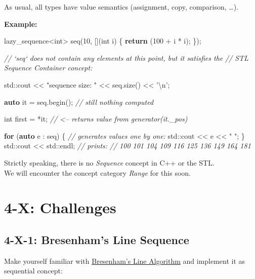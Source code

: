 \documentclass[]{article}
\newenvironment{Shaded}{}{}
\newcommand{\KeywordTok}[1]{\textcolor[rgb]{0.00,0.44,0.13}{\textbf{{#1}}}}
\newcommand{\DataTypeTok}[1]{\textcolor[rgb]{0.56,0.13,0.00}{{#1}}}
\newcommand{\DecValTok}[1]{\textcolor[rgb]{0.25,0.63,0.44}{{#1}}}
\newcommand{\CharTok}[1]{\textcolor[rgb]{0.25,0.44,0.63}{{#1}}}
\newcommand{\StringTok}[1]{\textcolor[rgb]{0.25,0.44,0.63}{{#1}}}
\newcommand{\CommentTok}[1]{\textcolor[rgb]{0.38,0.63,0.69}{\textit{{#1}}}}
\newcommand{\NormalTok}[1]{{#1}}
\begin{document}
As usual, all types have value semantics (assignment, copy, comparison,
\ldots{}).

\textbf{Example:}

\begin{Shaded}
\begin{Highlighting}[]
  \NormalTok{lazy_sequence<}\DataTypeTok{int}\NormalTok{> seq(}\DecValTok{10}\NormalTok{,}
                        \NormalTok{[](}\DataTypeTok{int} \NormalTok{i) \{}
                          \KeywordTok{return} \NormalTok{(}\DecValTok{100} \NormalTok{+ i * i);}
                        \NormalTok{\});}

  \CommentTok{// `seq` does not contain any elements at this point, but it satisfies the}
  \CommentTok{// STL Sequence Container concept:}

  \NormalTok{std::cout << }\StringTok{"sequence size: "} \NormalTok{<< seq.size() << }\StringTok{'}\CharTok{\textbackslash{}n}\StringTok{'}\NormalTok{;}

  \KeywordTok{auto} \NormalTok{it = seq.begin();}
  \CommentTok{// still nothing computed}

  \DataTypeTok{int} \NormalTok{first = *it; }\CommentTok{// <-- returns value from generator(it._pos)}

  \KeywordTok{for} \NormalTok{(}\KeywordTok{auto} \NormalTok{e : seq) \{}
    \CommentTok{// generates values one by one:}
    \NormalTok{std::cout << e << }\StringTok{" "}\NormalTok{;}
  \NormalTok{\}}
  \NormalTok{std::cout << std::endl;}
  \CommentTok{// prints:}
  \CommentTok{// 100 101 104 109 116 125 136 149 164 181}
\end{Highlighting}
\end{Shaded}

Strictly speaking, there is no \emph{Sequence} concept in C++ or the
STL.\\
We will encounter the concept category \emph{Range} for this soon.

\section{4-X: Challenges}\label{x-challenges}

\subsection{4-X-1: Bresenham's Line
Sequence}\label{x-1-bresenhams-line-sequence}

Make yourself familiar with
\href{http://graphics.idav.ucdavis.edu/education/GraphicsNotes/Bresenhams-Algorithm.pdf}{Bresenham's
Line Algorithm} and implement it as sequential concept:
\end{document}

